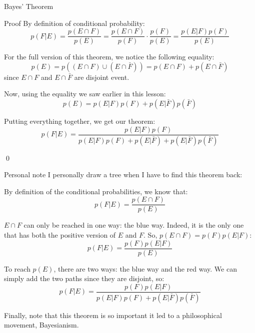 \documentclass[a4paper]{article}
\begin{document}
\begin{parag}{Bayes' Theorem}
    \begin{subparag}{Proof}
        By definition of conditional probability: 
        \[p\left(F|E\right) =\frac{p\left(E \cap F\right)}{p\left(E\right)} = \frac{p\left(E \cap F\right)}{p\left(F\right)} \cdot \frac{p\left(F\right)}{p\left(E\right)} = \frac{p\left(E | F\right) p\left(F\right)}{p\left(E\right)}\]

        For the full version of this theorem, we notice the following equality: 
        \[p\left(E\right) = p\left(\left(E \cap F\right) \cup \left(E \cap \bar{F}\right)\right) = p\left(E \cap F\right) + p\left(E \cap \bar{F}\right)\]
        since $E \cap F$ and $E \cap \bar{F}$ are disjoint event.

        Now, using the equality we saw earlier in this lesson:
        \[p\left(E\right) = p\left(E | F\right)p\left(F\right) + p\left(E|\bar{F}\right)p\left(\bar{F}\right)\]

        Putting everything together, we get our theorem: 
        \[p\left(F|E\right) = \frac{p\left(E | F\right)p\left(F\right)}{p\left(E|F\right)p\left(F\right) + p\left(E|\bar{F}\right) + p\left(E|\bar{F}\right)p\left(\bar{F}\right)}\]

        \qed
    \end{subparag}
    
    \begin{subparag}{Personal note}
        I personally draw a tree when I have to find this theorem back:

        By definition of the conditional probabilities, we know that:
        \[p\left(F|E\right) = \frac{p\left(E \cap F\right)}{p\left(E\right)}\]

        $E \cap F$ can only be reached in one way: the blue way. Indeed, it is the only one that has both the positive version of $E$ and $F$. So, $p\left(E \cap F\right) = p\left(F\right)p\left(E | F\right)$: 
        \[p\left(F|E\right) = \frac{p\left(F\right)p\left(E|F\right)}{p\left(E\right)}\]

        To reach $p\left(E\right)$, there are two ways: the blue way and the red way. We can simply add the two paths since they are disjoint, so:
        \[p\left(F|E\right) = \frac{p\left(F\right)p\left(E|F\right)}{p\left(E|F\right)p\left(F\right) + p\left(E|\bar{F}\right)p\left(\bar{F}\right)}\]

        Finally, note that this theorem is so important it led to a philosophical movement, Bayesianism.
    \end{subparag}
\end{parag}
\end{document}
